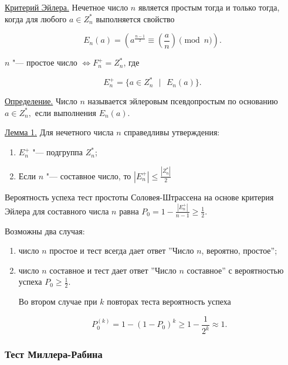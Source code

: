\documentclass[bachelor, och, labwork]{shiza}
\begin{document}
            \underline{Критерий Эйлера.} Нечетное число $n$ является простым
            тогда и только тогда, когда для любого $a \in Z^*_n$ выполняется
            свойство

            $$E_n (a) = \left(a^{\frac{n - 1}{2}} \equiv
            \left(\frac{a}{n}\right) \pmod n \right).$$

            $n$ "--- простое число $\Longleftrightarrow F^+_n = Z^*_n$, где 

            $$E^+_n = \{a \in Z^*_n \text{ } | \text{ } E_n (a) \}.$$

            \underline{Определение.} Число $n$ называется эйлеровым
            псевдопростым по основанию $a \in Z^*_n,$ если выполнения $E_n (a).$

            \underline{Лемма 1.} Для нечетного числа $n$ справедливы утверждения:

            \begin{enumerate}
                \item $E^+_n$ "--- подгруппа $Z^*_n$;
                \item Если $n$ "--- составное число, то $|E^+_n| \leq \frac{|Z^*_n|}{2}$
            \end{enumerate}

            Вероятность успеха тест простоты Соловея-Штрассена на основе
            критерия Эйлера для составного числа $n$ равна $P_0 = 1 -
            \frac{|E^+_n|}{n - 1} \geq \frac{1}{2}.$

            Возможны два случая:

            \begin{enumerate}
                \item число $n$ простое и тест всегда дает ответ ''Число $n$,
                вероятно, простое'';
                \item число $n$ составное и тест дает ответ ''Число $n$
                составное'' с вероятностью успеха $P_0 \geq \frac{1}{2}$.

                Во втором случае при $k$ повторах теста вероятность успеха
                
                $$P_0^{(k)} = 1 - (1 - P_0)^k \geq 1 - \frac{1}{2^k} \approx
                1.$$
            \end{enumerate}


        \subsubsection{Тест Миллера-Рабина}
\end{document}
